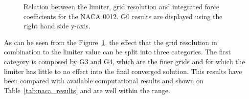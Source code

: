 \begin{figure}[]
  \begin{subfigmatrix}{2}
    \label{fig:lim_drag_AoA0}
    \label{fig:lim_lift_AoA0}
  \end{subfigmatrix}
  \begin{subfigmatrix}{2}
      \label{fig:lim_drag_AoA10}
      \label{fig:lim_lift_AoA10}
    \end{subfigmatrix}
    \begin{subfigmatrix}{2}
        \label{fig:lim_drag_AoA15}
        \label{fig:lim_lift_AoA15}
      \end{subfigmatrix}
  \caption{Relation between the limiter, grid resolution and integrated force coefficients for the NACA 0012. G0 results are displayed using the right hand side y-axis.}
  \label{fig:lim_grid}
\end{figure}

As can be seen from the Figure~\ref{fig:lim_grid}, the effect that the grid resolution in combination to the limiter value can be split into three categories. The first category is composed by G3 and G4, which are the finer grids and for which the limiter has little to no effect into the final converged solution. This results have been compared with available computational results and shown on Table~\ref{tab:naca_results} and are well within the range.

